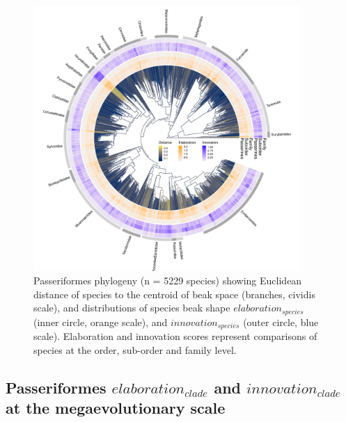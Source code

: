\documentclass[12pt,a4paper]{article}
\begin{document}
\begin{figure}[H]
\centering
    \includegraphics[width=0.9\textwidth]{Figures/InnovElabTree_passerine_supplement_revised.pdf}
\caption{Passeriformes phylogeny (n = 5229 species) showing Euclidean distance of species to the centroid of beak space (branches, cividis scale), and distributions of species beak shape $elaboration_{species}$ (inner circle, orange scale), and $innovation_{species}$ (outer circle, blue scale). Elaboration and innovation scores represent comparisons of species at the order, sub-order and family level.}
\label{fig_phylogeny_passeriformes}
\end{figure}


\newpage

\subsection{Passeriformes $elaboration_{clade}$ and $innovation_{clade}$ at the megaevolutionary scale}
\end{document}
